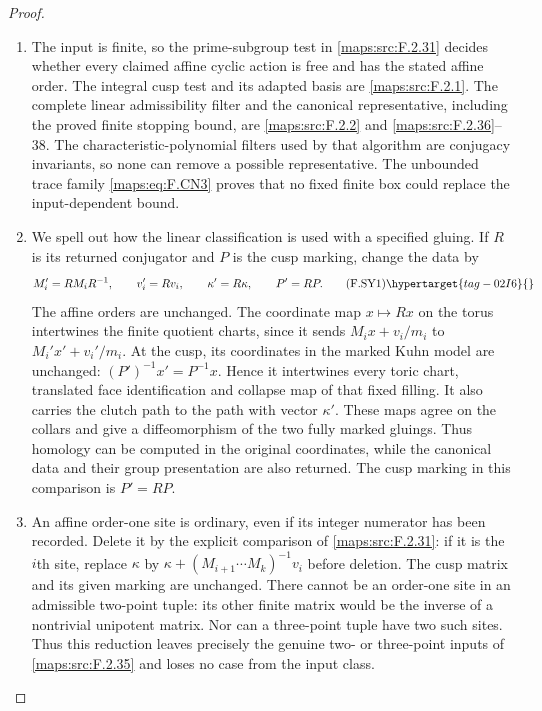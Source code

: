 \begin{proof}
\begin{enumerate}[label={$\langle1\rangle$\arabic*.}]
\item The input is finite, so the prime-subgroup test in \ref{maps:src:F.2.31}
decides whether every claimed affine cyclic action is free
and has the stated affine order.  The integral cusp test and
its adapted basis are \ref{maps:src:F.2.1}.  The complete linear admissibility
filter and the canonical representative, including the proved
finite stopping bound, are \ref{maps:src:F.2.2} and \ref{maps:src:F.2.36}--38.  The
characteristic-polynomial filters used by that algorithm are
conjugacy invariants, so none can remove a possible
representative.  The unbounded trace family \eqref{maps:eq:F.CN3} proves
that no fixed finite box could replace the input-dependent
bound.

\item We spell out how the linear classification is used with a
specified gluing.  If $R$ is its returned conjugator and
$P$ is the cusp marking, change the data by
\[
 M_i'=RM_iR^{-1},\qquad v_i'=Rv_i,\qquad
 \kappa'=R\kappa,\qquad P'=RP.                           \tag{F.SY1}\hypertarget{tag-02I6}{}\label{maps:eq:F.SY1}
\]
The affine orders are unchanged.  The coordinate map
$x\mapsto Rx$ on the torus intertwines the finite quotient
charts, since it sends $M_ix+v_i/m_i$ to
$M_i'x'+v_i'/m_i$.  At the cusp, its coordinates in the
marked Kuhn model are unchanged:
$(P')^{-1}x'=P^{-1}x$.  Hence it intertwines every toric
chart, translated face identification and collapse map of
that fixed filling.  It also carries the clutch path to
the path with vector $\kappa'$.  These maps agree on the
collars and give a diffeomorphism of the two fully marked
gluings.  Thus homology can be computed in the original
coordinates, while the canonical data and their group
presentation are also returned. The cusp marking in this
comparison is $P'=RP$.

\item An affine order-one site is ordinary, even if its integer
numerator has been recorded.  Delete it by the explicit comparison of \cref{maps:src:F.2.31}: if it is the $i$th site, replace
$\kappa$ by
$\kappa+(M_{i+1}\cdots M_k)^{-1}v_i$ before deletion.
The cusp matrix and its given marking are unchanged.
There cannot be an order-one site in an admissible two-point
tuple: its other finite matrix would be the inverse of a
nontrivial unipotent matrix.  Nor can a three-point tuple
have two such sites.  Thus this reduction leaves precisely
the genuine two- or three-point inputs of \ref{maps:src:F.2.35} and loses
no case from the input class.


\end{enumerate}
\end{proof}
